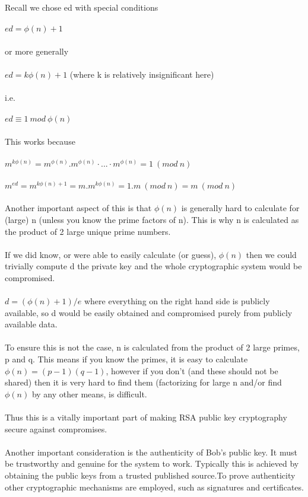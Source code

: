 \documentclass[11pt]{article}   	%
\begin{document}
Recall we chose ed with special conditions \\
\\
$ ed = \phi(n) + 1 $ \\
\\
or more generally \\
\\
$ ed = k\phi(n) + 1 $ (where k is relatively insignificant here) \\
\\
i.e. \\
\\
$ ed \equiv 1 \  mod \ \phi(n) $ \\
\\
This works because \\
\\
$ m^{k \phi(n)} = m^{\phi(n)} . m^{\phi(n)} · . . . · m^{\phi(n)} = 1 \ (mod \ n) $ \\
\\
$ m^{ed} = m^{k\phi(n) + 1} = m . m^{k \phi(n)} = 1.m \ (mod \ n) = m \ (mod \ n) $ \\
\\
Another important aspect of this is that $ \phi(n) $ is generally hard to calculate for (large) n (unless you know the prime factors of n). This is why n is calculated as the product of 2 large unique prime numbers. \\
\\
If we did know, or were able to easily calculate (or guess), $ \phi(n) $ then we could trivially compute d the private key and the whole cryptographic system would be compromised. \\
\\
$ d = (\phi(n) + 1) / e $ where everything on the right hand side is publicly available, so d would be easily obtained and compromised purely from publicly available data. \\
\\
To ensure this is not the case, n is calculated from the product of 2 large primes, p and q. This means if you know the primes, it is easy to calculate $ \phi(n) = (p-1)(q-1) $, however if you don't (and these should not be shared) then it is very hard to find them (factorizing for large n and/or find $ \phi(n) $ by any other means, is difficult. \\
\\
Thus this is a vitally important part of making RSA public key cryptography secure against compromises. \\
\\
Another important consideration is the authenticity of Bob's public key. It must be trustworthy and genuine for the system to work. Typically this is achieved by obtaining the public keys from a trusted published source.To prove authenticity other cryptographic mechanisms are employed, such as signatures and certificates. \\
\end{document}
